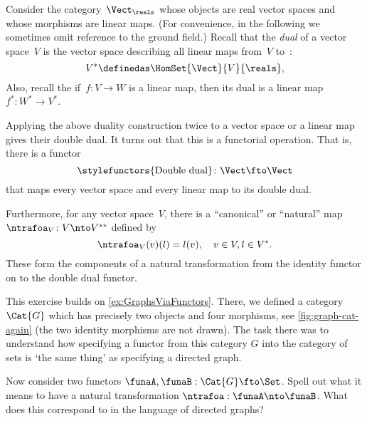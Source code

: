 \begin{example}\label{ex:Vect}
  Consider the category~$\Vect_{\reals}$ whose objects are real vector spaces and whose morphisms are linear maps. (For convenience, in the following we sometimes omit reference to the ground field.) Recall that the \emph{dual} of a vector space~$V$ is the vector space describing all linear maps from~$V$ to~\reals:
  \begin{equation}\label{eq:dual-vector-space}
    V^* \definedas \HomSet{\Vect}{V}{\reals},
  \end{equation}
  Also, recall the if~$f\colon V \to W$ is a linear map, then its dual is a linear map~$f^*\colon W^* \to V^*$.

  Applying the above duality construction twice to a vector space or a linear map gives their double dual. It turns out that this is a functorial operation. That is, there is a functor~
  \begin{equation}\label{eq:double-dual-functor}
      \text{\stylefunctors{Double dual}}\colon \Vect \fto \Vect
  \end{equation}
  that maps every vector space and every linear map to its double dual.

  Furthermore, for any vector space~$V$, there is a ``canonical'' or ``natural'' map~$\ntrafoa_V \colon V \nto V^{**}$ defined by
  \begin{equation}\label{eq:natural-trafo-to-double-dual}
    \ntrafoa_V(v)(l) = l(v), \quad  v \in V, l \in V^*.
  \end{equation}
  These form the components of a natural transformation from the identity functor on \Vect to the double dual functor.
  \begin{center}
  \end{center}
\end{example}



\begin{gradedexercise}\label{ex:NatTrafosGraphs}
This exercise builds on \cref{ex:GraphsViaFunctors}. There, we defined a category $\Cat{G}$ which has precisely two objects and four morphisms, see \cref{fig:graph-cat-again} (the two identity morphisms are not drawn). The task there was to understand how specifying a functor from this category $G$ into the category of sets is `the same thing' as specifying a directed graph.

Now consider two functors $\funaA, \funaB : \Cat{G} \fto \Set$. Spell out what it means to have a natural transformation $\ntrafoa: \funaA \nto \funaB$. What does this correspond to in the language of directed graphs?
\end{gradedexercise}

